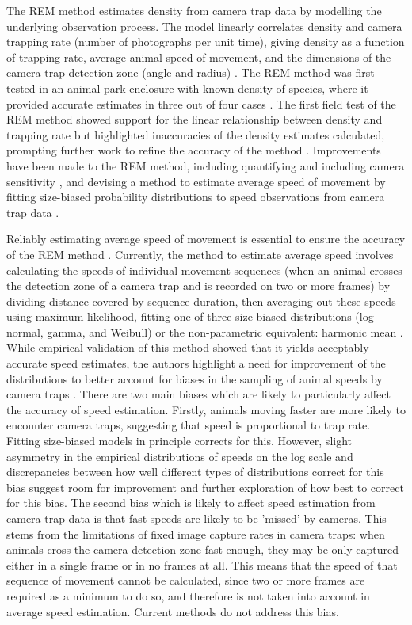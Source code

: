 \documentclass[a4paper,12pt,twoside]{report}
\begin{document}
	The REM method \cite{rowcliffe2008estimating} estimates density from camera trap data by modelling the underlying observation process. The model linearly correlates density and camera trapping rate (number of photographs per unit time), giving density as a function of  trapping rate, average animal speed of movement, and the dimensions of the camera trap detection zone (angle and radius) \cite{rowcliffe2008estimating}. The REM method was first tested in an animal park enclosure with known density of species, where it provided accurate estimates in three out of four cases \cite{rowcliffe2008estimating}. The first field test of the REM method showed support for the linear relationship between density and trapping rate but highlighted inaccuracies of the density estimates calculated, prompting further work to refine the accuracy of the method \cite{rovero2009camera}. Improvements have been made to the REM method, including quantifying and including camera sensitivity \cite{marcus2011quantifying}, and devising a method to estimate average speed of movement by fitting size-biased probability distributions to speed observations from camera trap data \cite{rowcliffe2016wildlife}.

	Reliably estimating average speed of movement is essential to ensure the accuracy of the REM method \cite{rowcliffe2016wildlife}. Currently, the method to estimate average speed involves calculating the speeds of individual movement sequences (when an animal crosses the detection zone of a camera trap and is recorded on two or more frames) by dividing distance covered by sequence duration, then averaging out these speeds using maximum likelihood, fitting one of three size-biased distributions (log-normal, gamma, and Weibull) or the non-parametric equivalent: harmonic mean \cite{rowcliffe2016wildlife}. While empirical validation of this method showed that it yields acceptably accurate speed estimates, the authors highlight a need for improvement of the distributions to better account for biases in the sampling of animal speeds by camera traps \cite{rowcliffe2016wildlife}. There are two main biases which are likely to particularly affect the accuracy of speed estimation. Firstly, animals moving faster are more likely to encounter camera traps, suggesting that speed is proportional to trap rate. Fitting size-biased models in principle corrects for this. However, slight asymmetry in the empirical distributions of speeds on the log scale and discrepancies between how well different types of distributions correct for this bias suggest room for improvement and further exploration of how best to correct for this bias\cite{rowcliffe2016wildlife}. The second bias which is likely to affect speed estimation from camera trap data is that fast speeds are likely to be 'missed' by cameras. This stems from the limitations of fixed image capture rates in camera traps: when animals cross the camera detection zone fast enough, they may be only captured either in a single frame or in no frames at all. This means that the speed of that sequence of movement cannot be calculated, since two or more frames are required as a minimum to do so, and therefore is not taken into account in average speed estimation. Current methods do not address this bias. 
	
\end{document}
